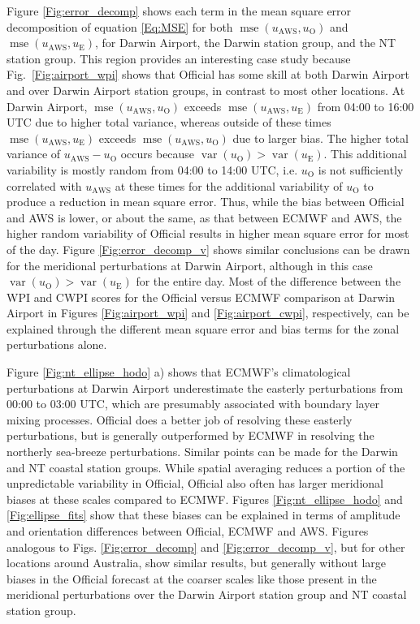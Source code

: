 \documentclass[twocol]{ametsoc}
\DeclareMathOperator{\mse}{mse}
\DeclareMathOperator{\var}{var}
\begin{document}
Figure \ref{Fig:error_decomp} shows each term in the mean square error decomposition of equation \ref{Eq:MSE} for both $\mse\left(u_\text{AWS}, u_\text{O}\right)$ and $\mse\left(u_\text{AWS}, u_\text{E}\right)$, for Darwin Airport, the Darwin station group, and the NT station group. This region provides an interesting case study because Fig.~\ref{Fig:airport_wpi} shows that Official has some skill at both Darwin Airport and over Darwin Airport station groups, in contrast to most other locations. At Darwin Airport, $\mse\left(u_\text{AWS}, u_\text{O}\right)$ exceeds $\mse\left(u_\text{AWS}, u_\text{E}\right)$ from 04:00 to 16:00 UTC due to higher total variance, whereas outside of these times $\mse\left(u_\text{AWS}, u_\text{E}\right)$ exceeds $\mse\left(u_\text{AWS}, u_\text{O}\right)$ due to larger bias. The higher total variance of $u_\text{AWS} - u_\text{O}$ occurs because $\var\left(u_\text{O}\right) > \var\left(u_\text{E}\right)$. This additional variability is mostly random from 04:00 to 14:00 UTC, i.e. $u_\text{O}$ is not sufficiently correlated with $u_\text{AWS}$ at these times for the additional variability of $u_\text{O}$ to produce a reduction in mean square error. Thus, while the bias between Official and AWS is lower, or about the same, as that between ECMWF and AWS, the higher random variability of Official results in higher mean square error for most of the day. Figure \ref{Fig:error_decomp_v} shows similar conclusions can be drawn for the meridional perturbations at Darwin Airport, although in this case $\var\left(u_\text{O}\right) > \var\left(u_\text{E}\right)$ for the entire day. Most of the difference between the WPI and CWPI scores for the Official versus ECMWF comparison at Darwin Airport in Figures \ref{Fig:airport_wpi} and \ref{Fig:airport_cwpi}, respectively, can be explained through the different mean square error and bias terms for the zonal perturbations alone. 

Figure \ref{Fig:nt_ellipse_hodo} a) shows that ECMWF's climatological perturbations at Darwin Airport underestimate the easterly perturbations from 00:00 to 03:00 UTC, which are presumably associated with boundary layer mixing processes. Official does a better job of resolving these easterly perturbations, but is generally outperformed by ECMWF in resolving the northerly sea-breeze perturbations. Similar points can be made for the Darwin and NT coastal station groups. While spatial averaging reduces a portion of the unpredictable variability in Official, Official also often has larger meridional biases at these scales compared to ECMWF. Figures \ref{Fig:nt_ellipse_hodo} and \ref{Fig:ellipse_fits} show that these biases can be explained in terms of amplitude and orientation differences between Official, ECMWF and AWS. Figures analogous to Figs. \ref{Fig:error_decomp} and \ref{Fig:error_decomp_v}, but for other locations around Australia, show similar results, but generally without large biases in the Official forecast at the coarser scales like those present in the meridional perturbations over the Darwin Airport station group and NT coastal station group.   
\end{document}
